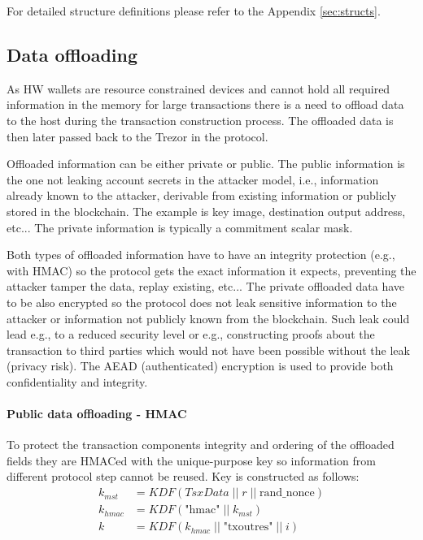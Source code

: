 \documentclass[]{article}
\begin{document}
For detailed structure definitions please refer to the Appendix \ref{sec:structs}. 

\subsection{Data offloading}
As HW wallets are resource constrained devices and cannot hold all required information in the memory for large transactions there is a need to offload data to the host during the transaction construction process. The offloaded data is then later passed back to the Trezor in the protocol.

Offloaded information can be either private or public. The public information is the one not leaking account secrets in the attacker model, i.e., information already known to the attacker, derivable from existing information or publicly stored in the blockchain. The example is key image, destination output address, etc... The private information is typically a commitment scalar mask.

Both types of offloaded information have to have an integrity protection (e.g., with HMAC) so the protocol gets the exact information it expects, preventing the attacker tamper the data, replay existing, etc...
The private offloaded data have to be also encrypted so the protocol does not leak sensitive information to the attacker or information not publicly known from the blockchain. Such leak could lead e.g., to a reduced security level or e.g., constructing proofs about the transaction to third parties which would not have been possible without the leak (privacy risk). The AEAD (authenticated) encryption is used to provide both confidentiality and integrity.


\paragraph{Public data offloading - HMAC}
To protect the transaction components integrity and ordering of the offloaded fields they are HMACed with the unique-purpose key so information from different protocol step cannot be reused. Key is constructed as follows:
\begin{equation}
\begin{split} \label{eq:det_mask}
k_{mst} &= \textit{KDF}(TsxData \; || \; r \; || \; \text{rand\_nonce})\\
k_{hmac} &= \textit{KDF}\left(\text{"hmac"} \; || \; k_{mst}\right)\\
k &= \textit{KDF}(k_{hmac} \; || \; \text{"txoutres"} \; || \; i)
\end{split}
\end{equation}
\end{document}
